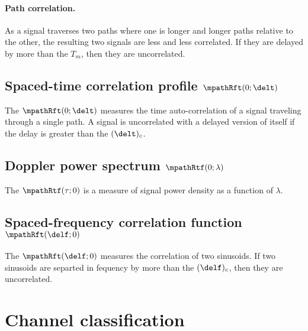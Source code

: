 \paragraph{Path correlation.}
As a signal traverses two paths where one is longer and longer paths relative to the other, 
the resulting two signals are less and less correlated.
If they are delayed by more than the  $T_m$,
then they are uncorrelated.

\subsection*{Spaced-time correlation profile $\mpathRft(0;\delt)$}
The  $\mpathRft(0;\delt)$
measures the time auto-correlation of a signal traveling through a 
single path.
A signal is uncorrelated with a delayed version of itself if the delay 
is greater than the  $(\delt)_c$.

\subsection*{Doppler power spectrum $\mpathRtf(0;\lambda)$}
The  $\mpathRtf(\tau;0)$ 
is a measure of signal power density as a function of $\lambda$.


\subsection*{Spaced-frequency correlation function $\mpathRft(\delf;0)$}
The  $\mpathRft(\delf;0)$
measures the correlation of two sinusoids. 
If two sinusoids are separted in fequency by more than the 
 $(\delf)_c$, then they are uncorrelated.


\section{Channel classification}

